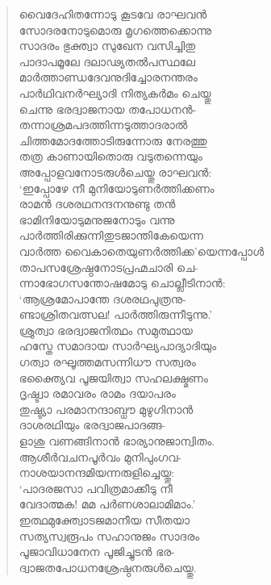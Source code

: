 \begin{verse}
വൈദേഹിതന്നോടു കൂടവേ രാഘവന്‍\\
സോദരനോടുമൊരു മൃഗത്തെക്കൊന്നു\\
സാദരം ഭുക്ത്വാ സുഖേന വസിച്ചിതു\\
പാദാപമൂലേ ദലാഢ്യതല്‍പസ്ഥലേ\\
മാര്‍ത്താണ്ഡദേവനുദിച്ചോരനന്തരം\\
പാര്‍ഥിവനര്‍ഘ്യാദി നിത്യകര്‍മം ചെയ്തു\\
ചെന്നു ഭരദ്വാജനായ തപോധനന്‍-\\
തന്നാശ്രമപദത്തിന്നടുത്താദരാല്‍\\
ചിത്തമോദത്തോടിരുന്നോരു നേരത്തു\\
തത്ര കാണായിതൊരു വടുതന്നെയും\\
അപ്പോളവനോടരുള്‍ചെയ്തു രാഘവന്‍:\\
‘ഇപ്പോഴേ നീ മുനിയോടുണര്‍ത്തിക്കണം\\
രാമന്‍ ദശരഥനന്ദനനുണ്ടു തന്‍\\
ഭാമിനിയോടുമനുജനോടും വന്നു\\
പാര്‍ത്തിരിക്കുന്നിതുടജാന്തികേയെന്ന\\
വാര്‍ത്ത വൈകാതെയുണര്‍ത്തിക്ക’യെന്നപ്പോള്‍\\
താപസശ്രേഷ്ഠനോടപ്രഹ്മചാരി ചെ-\\
ന്നാഭോഗസന്തോഷമോടു ചൊല്ലീടിനാന്‍:\\
‘ആശ്രമോപാന്തേ ദശരഥപുത്രനു-\\
ണ്ടാശ്രിതവത്സല! പാര്‍ത്തിരുന്നീടുന്നു.’\\
ശ്രുത്വാ ഭരദ്വാജനിത്ഥം സമുത്ഥായ\\
ഹസ്തേ സമാദായ സാര്‍ഘ്യപാദ്യാദിയും\\
ഗത്വാ രഘൂത്തമസന്നിധൗ സത്വരം\\
ഭക്ത്യൈവ പൂജയിത്വാ സഹലക്ഷ്മണം\\
ദൃഷ്ട്വാ രമാവരം രാമം ദയാപരം\\
തുഷ്ട്യാ പരമാനന്ദാബ്ധൗ മുഴുഗിനാന്‍\\
ദാശരഥിയും ഭരദ്വാജപാദങ്ങ-\\
ളാശു വണങ്ങിനാന്‍ ഭാര്യാനുജാന്വിതം.\\
ആശീര്‍വചനപൂര്‍വം മുനിപുംഗവ-\\
നാശയാനന്ദമിയന്നരുളിച്ചെയ്തു:\\
‘പാദരജസാ പവിത്രമാക്കീടു നീ\\
വേദാത്മക! മമ പര്‍ണശാലാമിമാം.’\\
ഇത്ഥമുക്ത്വോടജമാനീയ സീതയാ\\
സത്യസ്വരൂപം സഹാനുജം സാദരം\\
പൂജാവിധാനേന പൂജിച്ചുടന്‍ ഭര-\\
ദ്വാജതപോധനശ്രേഷ്ഠനരുള്‍ചെയ്തു.\\

\end{verse}
